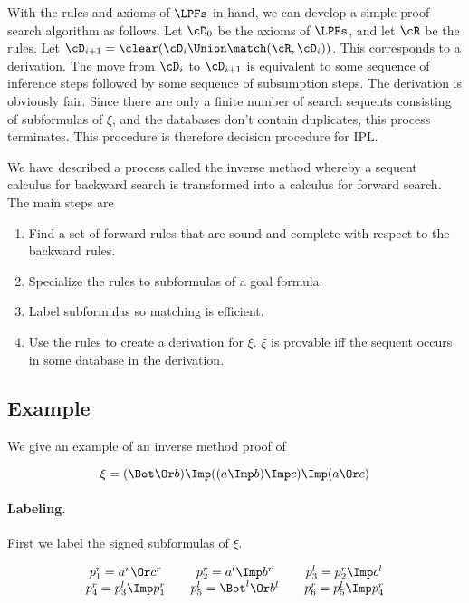 With the rules and axioms of $\LPFs$ in hand, we can develop a simple proof
search algorithm as follows.  Let $\cD_0$ be the axioms of $\LPFs$, and let
$\cR$ be the rules.  Let $\cD_{i+1}=\clear(\cD_i\Union\match(\cR, \cD_i))$.
This corresponds to a derivation.  The move from $\cD_i$ to $\cD_{i+1}$ is
equivalent to some sequence of inference steps followed by some sequence of
subsumption steps.  The derivation is obviously fair.  Since there are only a
finite number of search sequents consisting of subformulas of $\xi$, and the
databases don't contain duplicates, this process terminates.  This procedure is
therefore decision procedure for IPL.

We have described a process called the inverse method whereby
a sequent calculus for backward search is transformed into a
calculus for forward search.  The main steps are

\begin{enumerate}
\item Find a set of forward rules that are sound and complete with
  respect to the backward rules.
\item Specialize the rules to subformulas of a goal formula.
\item Label subformulas so matching is efficient.
\item\label{prop.enum.rules}
  Use the rules to create a derivation for $\xi$.  $\xi$ is
  provable iff the sequent occurs in some database in the derivation.
\end{enumerate}

\subsection{Example}

We give an example of an inverse method proof of

\[
\xi = (\Bot \Or b) \Imp ((a \Imp b) \Imp c) \Imp (a \Or c)
\]

\paragraph{Labeling.}

First we label the signed subformulas of $\xi$.

\[
\begin{array}{c@{\hspace{2em}}c@{\hspace{2em}}c}
p_1^r = a^r \Or c^r & p_2^r = a^l \Imp b^r & p_3^l = p_2^r \Imp c^l \\
p_4^r = p_3^l \Imp p_1^r & p_5^l = \Bot^l \Or b^l & p_6^r = p_5^l \Imp p_4^r
\end{array}
\]

